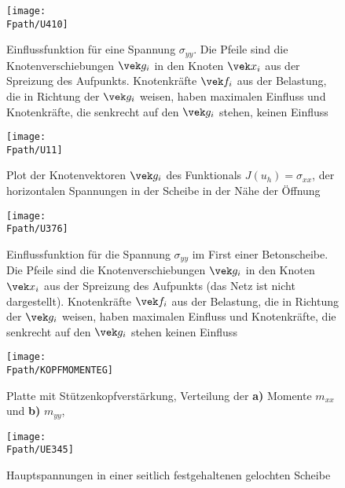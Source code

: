 {{{%
\begin{figure}
\centering
{\texttt{[image: \\Fpath/U410]}}
  \caption{Einflussfunktion f\"{u}r eine Spannung $\sigma_{yy}$. Die Pfeile sind die Knotenverschiebungen $\vek g_i$ in den Knoten $\vek x_i$ aus der Spreizung des Aufpunkts. Knotenkr\"{a}fte $\vek f_i$ aus der Belastung, die in Richtung der $\vek g_i$ weisen, haben maximalen Einfluss und Knotenkr\"{a}fte, die senkrecht auf den $\vek g_i$ stehen, keinen Einfluss} \label{U410}
\end{figure}
\begin{figure}
\centering
{\texttt{[image: \\Fpath/U11]}}
  \caption{ Plot der Knotenvektoren $\vek g_i$ des Funktionals $J(u_h) = \sigma_{xx}$, der horizontalen Spannungen in der Scheibe in der N\"{a}he der \"{O}ffnung}
  \label{U11}
\end{figure}%

\begin{figure}
\centering
{\texttt{[image: \\Fpath/U376]}}
  \caption{Einflussfunktion f\"{u}r die Spannung $\sigma_{yy}$ im First einer Betonscheibe. Die Pfeile sind die Knotenverschiebungen $\vek g_i$ in den Knoten $\vek x_i$ aus der Spreizung des Aufpunkts (das Netz ist nicht dargestellt). Knotenkr\"{a}fte $\vek f_i$ aus der Belastung, die in Richtung der $\vek g_i$ weisen, haben maximalen Einfluss und Knotenkr\"{a}fte, die senkrecht auf den $\vek g_i$ stehen keinen Einfluss} \label{U277}
\end{figure}


\begin{figure}
\centering
{\texttt{[image: \\Fpath/KOPFMOMENTEG]}}
  \caption{Platte mit St\"{u}tzenkopfverst\"{a}rkung, Verteilung der \textbf{a)} Momente $m_{xx}$ und  \textbf{b)} $m_{yy}$, \cite{Ha5}} \label{Kopfmomente}
\end{figure}

\begin{figure}
\centering
{\texttt{[image: \\Fpath/UE345]}}
  \caption{Hauptspannungen in einer seitlich festgehaltenen gelochten Scheibe} \label{UE345}
\end{figure}

}}}
